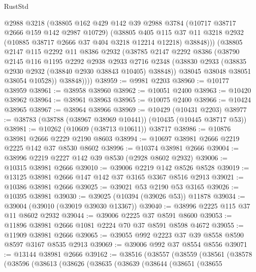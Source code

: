 \begin{lexlean}{RustStd}
\begin{coremodule}
            @2988
            @3218
            (@38805
              @162
              @429
              @142
              @39
              @2988
              @3784
              (@10717 @38717 @2666 @159 @142 @2987 @10729)
              (@38805
                @405
                @115
                @37
                @11
                @3218
                @2932
                (@10885 @38717 @2666 @37 @404 @3218 @12214 @12218)
                @38848)))
          (@38805
            @2147
            @115
            @2292
            @11
            @8386
            @2932
            (@38785
              @2147
              @2292
              @8386
              (@38790
                @2145
                @116
                @1195
                @2292
                @2938
                @2933
                @2716
                @2348
                (@38830 @2933 (@38835 @2930 @2932 (@38840 @2930 @38843 @10405) @38848))
                @38045
                @38048
                @38051
                @38054
                @10528))
            @38848))))
@38959 := @9981 @2203
@38960 := @10177 @38959
@38961 := @38958 @38960
@38962 := @10051 @2400
@38963 := @10420 @38962
@38964 := @38961 @38963
@38965 := @10075 @2400
@38966 := @10424 @38965
@38967 := @38964 @38966
@38969 := @10429 (@10431 @2203)
@38977 := @38783 (@38788 (@38967 @38969 @10441)) (@10435 (@10445 @38717 @53))
@38981 := @10262 (@10609 (@38713 @10611)) @38717
@38986 := @10876 @38981 @2666 @2229 @2190 @8603
@38994 := @10697 @38981 @2666 @2219 @2225 @142 @37 @8530 @8602
@38996 := @10374 @38981 @2666
@39004 := @38996 @2219 @2227 @142 @39 @8530 (@2928 @8602 @2932)
@39006 := @10315 @38981 @2666
@39010 := @39006 @2219 @142 @8526 @8528
@39019 := @13125 @38981 @2666 @147 @142 @37 @3165 @3367 @8516 @2913
@39021 := @10386 @38981 @2666
@39025 := @39021 @53 @2190 @53 @3165
@39026 := @10395 @38981
@39030 := @39025 (@10394 (@39026 @53)) @11878
@39034 := @39004 (@39010 (@39019 @39030 @13367))
@39040 := @38996 @2225 @115 @37 @11 @8602 @2932
@39044 := @39006 @2225 @37 @8591 @8600
@39053 := @11896 @38981 @2666 @1081 @2224 @70 @37 @8591 @8598 @4672
@39055 := @11909 @38981 @2666
@39065 := @39055 @992 @2223 @37 @39 @8558 @8590 @8597 @3167 @8535 @2913
@39069 := @39006 @992 @37 @8554 @8556
@39071 := @13144 @38981 @2666
@39162 := @38516
    (@38557
      (@38559
        (@38561
          (@38578
            (@38596
              (@38613
                (@38626
                  (@38635
                    (@38639
                      (@38644
                        (@38651
                          (@38655

\end{coremodule}
\end{lexlean}
